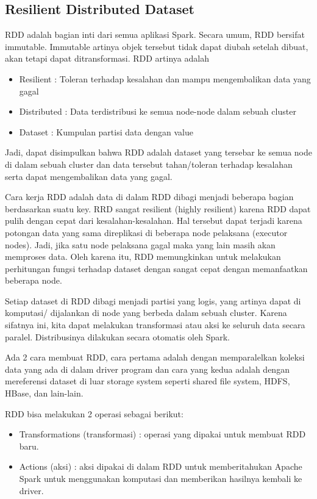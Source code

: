 \subsection{Resilient Distributed Dataset}
RDD adalah bagian inti dari semua aplikasi Spark. Secara umum, RDD bersifat immutable.  Immutable artinya objek tersebut tidak dapat diubah setelah dibuat, akan tetapi dapat ditransformasi. RDD artinya adalah
\begin{itemize}
\item Resilient	: Toleran terhadap kesalahan dan mampu mengembalikan data yang gagal
\item Distributed	: Data terdistribusi ke semua node-node dalam sebuah cluster
\item Dataset		: Kumpulan partisi data dengan value
\end{itemize}
Jadi, dapat disimpulkan bahwa RDD adalah dataset yang tersebar ke semua node di dalam sebuah cluster dan data tersebut tahan/toleran terhadap kesalahan serta dapat mengembalikan data yang gagal.

Cara kerja RDD adalah data di dalam RDD dibagi menjadi beberapa bagian berdasarkan suatu key. RRD sangat resilient (highly resilient) karena RDD dapat pulih dengan cepat dari kesalahan-kesalahan. Hal tersebut dapat terjadi karena potongan data yang sama direplikasi di beberapa node pelaksana (executor nodes). Jadi, jika satu node pelaksana gagal maka yang lain masih akan memproses data. Oleh karena itu, RDD memungkinkan untuk melakukan perhitungan fungsi terhadap dataset dengan sangat cepat dengan memanfaatkan beberapa node.

Setiap dataset di RDD dibagi menjadi partisi yang logis, yang artinya dapat di komputasi/ dijalankan di node yang berbeda dalam sebuah cluster. Karena sifatnya ini, kita dapat melakukan transformasi atau aksi ke seluruh data secara paralel. Distribusinya dilakukan secara otomatis oleh Spark.

Ada 2 cara membuat RDD, cara pertama adalah dengan memparalelkan koleksi data yang ada di dalam driver program dan cara yang kedua adalah dengan mereferensi dataset di luar storage system seperti shared file system, HDFS, HBase, dan lain-lain.

RDD bisa melakukan 2 operasi sebagai berikut:
\begin{itemize}
\item Transformations (transformasi) : operasi yang dipakai untuk membuat RDD baru.
\item Actions (aksi) : aksi dipakai di dalam RDD untuk memberitahukan Apache Spark untuk menggunakan komputasi dan memberikan hasilnya kembali ke driver.
\end{itemize}

